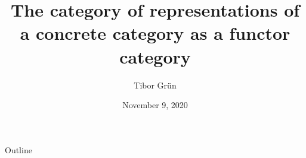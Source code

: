 \documentclass{beamer}
\title[The category of representations]
{The category of representations of a concrete category as a functor category}
\author{Tibor Gr{\"u}n}
\date{November 9, 2020} %
\begin{document}
\begin{frame}
  \titlepage
\end{frame}

\begin{frame}{Outline}
  \tableofcontents
\end{frame}
\end{document}

